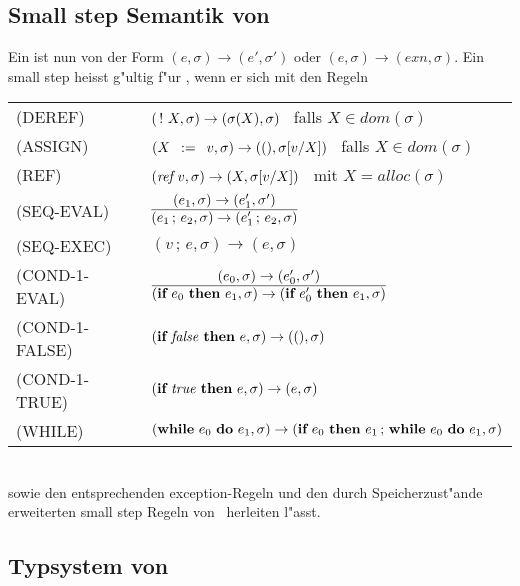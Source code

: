 \subsection{Small step Semantik von \LFOUR}

Ein  ist nun von der Form $(e,\sigma) \to (e',\sigma')$ oder $(e,\sigma) \to (exn,\sigma)$. Ein small
step heisst g"ultig f"ur \LFOUR, wenn er sich mit den Regeln\\[5mm]
  \begin{tabular}{ll}
    \mbox{(DEREF)}        & $(\,!\,\,X, \sigma) \to (\sigma(X), \sigma)$   \ falls $X \in dom(\sigma)$ \\[3mm]
    \mbox{(ASSIGN)}       & $(X\,\ :=\ \,v, \sigma) \to ((), \sigma[v/X])$ \ falls $X \in dom(\sigma)$ \\[3mm]
    \mbox{(REF)}          & $({\text{\it ref\/}}\,v, \sigma) \to (X, \sigma[v/X])$        \ mit $X = alloc(\sigma)$ \\[3mm]
    \mbox{(SEQ-EVAL)}     & $\regel{(e_1,\sigma) \to (e_1',\sigma')}
                                   {(e_1\,;\,e_2,\sigma) \to (e_1'\,;\,e_2,\sigma)}$ \\[5mm]
    \mbox{(SEQ-EXEC)}     & $(v\,;\,e,\sigma) \to (e,\sigma)$ \\[3mm]
    \mbox{(COND-1-EVAL)}  & $\regel{(e_0,\sigma) \to (e_0',\sigma')}
                                   {(\bift{e_0}{e_1},\sigma) \to (\bift{e_0'}{e_1},\sigma)}$ \\[5mm]
    \mbox{(COND-1-FALSE)} & $(\textbf{if}\ {\text{\it false\/}}\ \textbf{then}\ e,\sigma) \to ((),\sigma)$ \\[3mm]
    \mbox{(COND-1-TRUE)}  & $(\textbf{if}\ {\text{\it true\/}}\ \textbf{then}\ e,\sigma) \to (e,\sigma)$ \\[3mm]
    \mbox{(WHILE)}        & $(\textbf{while}\ e_0\ \textbf{do}\ e_1,\sigma) \to (\textbf{if}\ e_0\ \textbf{then}\ e_1\,;\,\textbf{while}\ e_0\ \textbf{do}\ e_1, \sigma)$
  \end{tabular}\\[7mm]
sowie den entsprechenden exception-Regeln und den durch Speicherzust"ande erweiterten small step Regeln von \LTHREE\ 
herleiten l"asst.


\subsection{Typsystem von \LFOUR}

